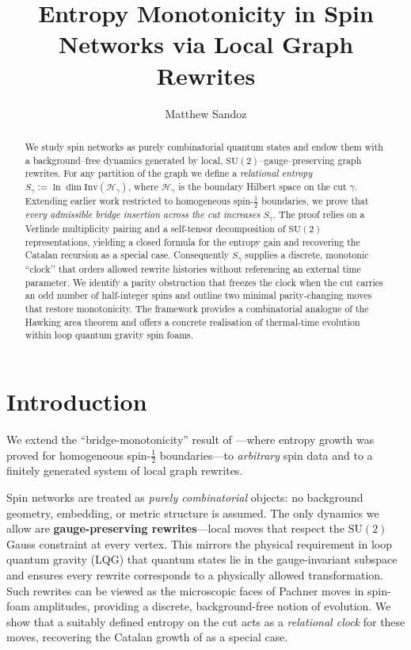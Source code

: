 \documentclass[11pt]{article}
\title{Entropy Monotonicity in Spin Networks via Local Graph Rewrites}
\author{Matthew Sandoz}
\newcommand{\SU}{\mathrm{SU}(2)}
\newcommand{\Inv}{\mathrm{Inv}}
\begin{document}
\maketitle

\begin{abstract}
We study spin networks as purely combinatorial quantum states and endow
them with a background--free dynamics generated by local,
$\mathrm{SU}(2)$--gauge--preserving graph rewrites.  For any partition of
the graph we define a \emph{relational entropy}
$S_{\gamma}:=\ln\!\dim\!\Inv(\mathcal H_\gamma)$, where
$\mathcal H_\gamma$ is the boundary Hilbert space on the cut
$\gamma$.  Extending earlier work restricted to homogeneous
spin-$\tfrac12$ boundaries, we prove that \emph{every admissible bridge
insertion across the cut increases $S_{\gamma}$}.  The proof relies on a
Verlinde multiplicity pairing and a self-tensor decomposition of
$\mathrm{SU}(2)$ representations, yielding a closed formula for the
entropy gain and recovering the Catalan recursion as a special case.
Consequently $S_{\gamma}$ supplies a discrete, monotonic “clock’’ that
orders allowed rewrite histories without referencing an external time
parameter.  We identify a parity obstruction that freezes the clock when
the cut carries an odd number of half-integer spins and outline two
minimal parity-changing moves that restore monotonicity.  The framework
provides a combinatorial analogue of the Hawking area theorem and offers
a concrete realisation of thermal-time evolution within loop quantum
gravity spin foams.
\end{abstract}

\tableofcontents


\section{Introduction} We extend the ``bridge-monotonicity'' result of \cite{SandozBridgeMonotonicity2025}—where entropy growth was proved for homogeneous spin-$\tfrac12$ boundaries—to \emph{arbitrary} spin data and to a finitely generated system of local graph rewrites.

Spin networks are treated as \emph{purely combinatorial} objects: no background geometry, embedding, or metric structure is assumed. The only dynamics we allow are \textbf{gauge-preserving rewrites}—local moves that respect the $\SU$ Gauss constraint at every vertex. This mirrors the physical requirement in loop quantum gravity (LQG) that quantum states lie in the gauge-invariant subspace and ensures every rewrite corresponds to a physically allowed transformation. Such rewrites can be viewed as the microscopic faces of Pachner moves in spin-foam amplitudes, providing a discrete, background-free notion of evolution. We show that a suitably defined entropy on the cut acts as a \emph{relational clock} for these moves, recovering the Catalan growth of \cite{SandozBridgeMonotonicity2025} as a special case.
\end{document}
